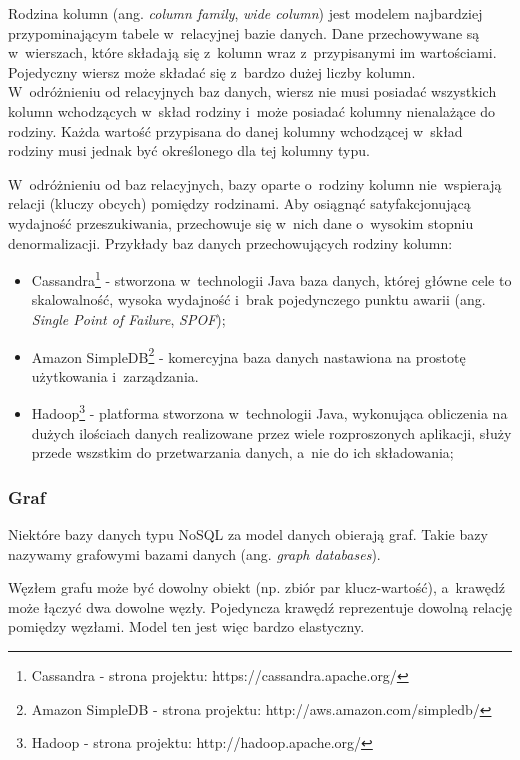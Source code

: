 Rodzina kolumn (ang. \emph{column family}, \emph{wide column}) jest modelem najbardziej przypominającym tabele w~relacyjnej bazie danych.
Dane przechowywane są w~wierszach, które składają się z~kolumn wraz z~przypisanymi im wartościami.
Pojedyczny wiersz może składać się z~bardzo dużej liczby kolumn.
W~odróżnieniu od relacyjnych baz danych, wiersz nie musi posiadać wszystkich kolumn wchodzących w~skład rodziny i~może posiadać kolumny nienalażące do rodziny.
Każda wartość przypisana do danej kolumny wchodzącej w~skład rodziny musi jednak być określonego dla tej kolumny typu.

W~odróżnieniu od baz relacyjnych, bazy oparte o~rodziny kolumn nie~wspierają relacji (kluczy obcych) pomiędzy rodzinami.
Aby osiągnąć satyfakcjonującą wydajność przeszukiwania, przechowuje się w~nich dane o~wysokim stopniu denormalizacji.
Przykłady baz danych przechowujących rodziny kolumn:

\begin{itemize}
 \item Cassandra\footnote{Cassandra - strona projektu: https://cassandra.apache.org/} - stworzona w~technologii Java baza danych, której główne cele to skalowalność, wysoka wydajność i~brak pojedynczego punktu awarii (ang. \emph{Single Point of Failure}, \emph{SPOF});
 \item Amazon SimpleDB\footnote{Amazon SimpleDB - strona projektu: http://aws.amazon.com/simpledb/} - komercyjna baza danych nastawiona na prostotę użytkowania i~zarządzania.
 \item Hadoop\footnote{Hadoop - strona projektu: http://hadoop.apache.org/} - platforma stworzona w~technologii Java, wykonująca obliczenia na dużych ilościach danych realizowane przez wiele rozproszonych aplikacji, służy przede wszstkim do przetwarzania danych, a~nie do ich składowania;
\end{itemize}

\subsubsection{Graf}

Niektóre bazy danych typu NoSQL za model danych obierają graf.
Takie bazy nazywamy grafowymi bazami danych (ang. \emph{graph databases}).

Węzłem grafu może być dowolny obiekt (np. zbiór par klucz-wartość), a~krawędź może łączyć dwa dowolne węzły.
Pojedyncza krawędź reprezentuje dowolną relację pomiędzy węzłami.
Model ten jest więc bardzo elastyczny.

